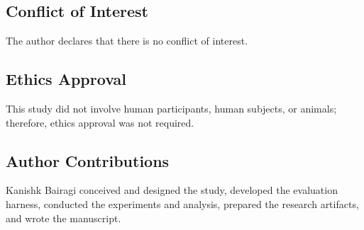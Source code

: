 \documentclass[conference]{IEEEtran}
\begin{document}
\subsection*{Conflict of Interest}
The author declares that there is no conflict of interest.

\subsection*{Ethics Approval}
This study did not involve human participants, human subjects, or animals; therefore, ethics approval was not required.

\subsection*{Author Contributions}
Kanishk Bairagi conceived and designed the study, developed the evaluation harness, conducted the experiments and analysis, prepared the research artifacts, and wrote the manuscript.
\end{document}
